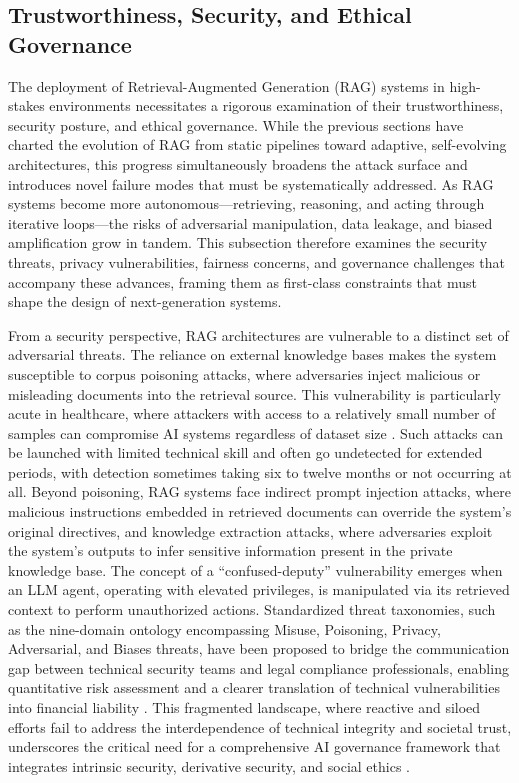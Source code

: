 \documentclass[11pt]{article}
\begin{document}
\subsection{Trustworthiness, Security, and Ethical Governance}

The deployment of Retrieval-Augmented Generation (RAG) systems in high-stakes environments necessitates a rigorous examination of their trustworthiness, security posture, and ethical governance. While the previous sections have charted the evolution of RAG from static pipelines toward adaptive, self-evolving architectures, this progress simultaneously broadens the attack surface and introduces novel failure modes that must be systematically addressed. As RAG systems become more autonomous---retrieving, reasoning, and acting through iterative loops---the risks of adversarial manipulation, data leakage, and biased amplification grow in tandem. This subsection therefore examines the security threats, privacy vulnerabilities, fairness concerns, and governance challenges that accompany these advances, framing them as first-class constraints that must shape the design of next-generation systems.

From a security perspective, RAG architectures are vulnerable to a distinct set of adversarial threats. The reliance on external knowledge bases makes the system susceptible to corpus poisoning attacks, where adversaries inject malicious or misleading documents into the retrieval source. This vulnerability is particularly acute in healthcare, where attackers with access to a relatively small number of samples can compromise AI systems regardless of dataset size \cite{ref613}. Such attacks can be launched with limited technical skill and often go undetected for extended periods, with detection sometimes taking six to twelve months or not occurring at all. Beyond poisoning, RAG systems face indirect prompt injection attacks, where malicious instructions embedded in retrieved documents can override the system's original directives, and knowledge extraction attacks, where adversaries exploit the system's outputs to infer sensitive information present in the private knowledge base. The concept of a ``confused-deputy'' vulnerability emerges when an LLM agent, operating with elevated privileges, is manipulated via its retrieved context to perform unauthorized actions. Standardized threat taxonomies, such as the nine-domain ontology encompassing Misuse, Poisoning, Privacy, Adversarial, and Biases threats, have been proposed to bridge the communication gap between technical security teams and legal compliance professionals, enabling quantitative risk assessment and a clearer translation of technical vulnerabilities into financial liability \cite{ref614}. This fragmented landscape, where reactive and siloed efforts fail to address the interdependence of technical integrity and societal trust, underscores the critical need for a comprehensive AI governance framework that integrates intrinsic security, derivative security, and social ethics \cite{ref615}.
\end{document}
